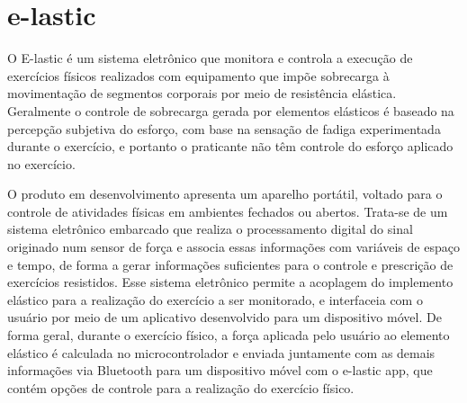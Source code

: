 \chapter{e-lastic}
O E-lastic é um sistema eletrônico que monitora e controla a execução de exercícios físicos realizados com equipamento que impõe sobrecarga à movimentação de segmentos corporais por meio de resistência elástica. Geralmente o controle de sobrecarga gerada por elementos elásticos é baseado na percepção subjetiva do esforço, com base na sensação de fadiga experimentada durante o exercício, e portanto o praticante não têm controle do esforço aplicado no exercício.

O produto em desenvolvimento apresenta um aparelho portátil, voltado para o controle de atividades físicas em ambientes fechados ou abertos. Trata-se de um sistema eletrônico embarcado que realiza o processamento digital do sinal originado num sensor de força e associa essas informações com variáveis de espaço e tempo, de forma a gerar informações suficientes para o controle e prescrição de exercícios resistidos. Esse sistema eletrônico permite a acoplagem do implemento elástico para a realização do exercício a ser monitorado, e interfaceia com o usuário por meio de um aplicativo desenvolvido para um dispositivo móvel. De forma geral, durante o exercício físico, a força aplicada pelo usuário ao elemento elástico é calculada no microcontrolador e enviada juntamente com as demais informações via Bluetooth para um dispositivo móvel com o e-lastic app, que contém opções de controle para a realização do exercício físico.



 


